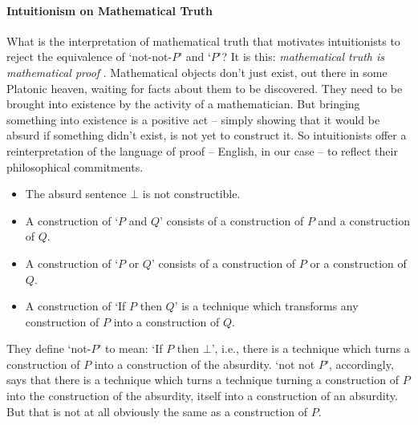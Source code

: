 \paragraph{Intuitionism on Mathematical Truth} What is the interpretation of mathematical truth that motivates intuitionists to reject the equivalence of `not-not-$P$' and `$P$'? It is this: \emph{mathematical truth is mathematical proof} \citep{shap}. Mathematical objects don't just exist, out there in some Platonic heaven, waiting for facts about them to be discovered. They need to be brought into existence by the activity of a mathematician. But bringing something into existence is a positive act – simply showing that it would be absurd if something didn't exist, is not yet to construct it. So intuitionists offer a reinterpretation of the language of proof – English, in our case – to reflect their philosophical commitments. \begin{itemize}
  \item The absurd sentence $\bot$ is not constructible.
\item A construction of `$P$ and $Q$' consists of a construction of $P$ and a construction of $Q$.
\item A construction of `$P$ or $Q$' consists of a construction of $P$ or a construction of $Q$.
\item A construction of `If $P$ then $Q$' is a technique which transforms any construction of $P$ into a construction of $Q$.
\end{itemize} They define `not-$P$' to mean: `If $P$ then $\bot$', i.e., there is a technique which turns a construction of $P$ into a construction of the absurdity. `not not $P$', accordingly, says that there is a technique which turns a technique turning a construction of $P$ into the construction of the absurdity, itself into a construction of an absurdity. But that is not at all obviously the same as a construction of $P$.

